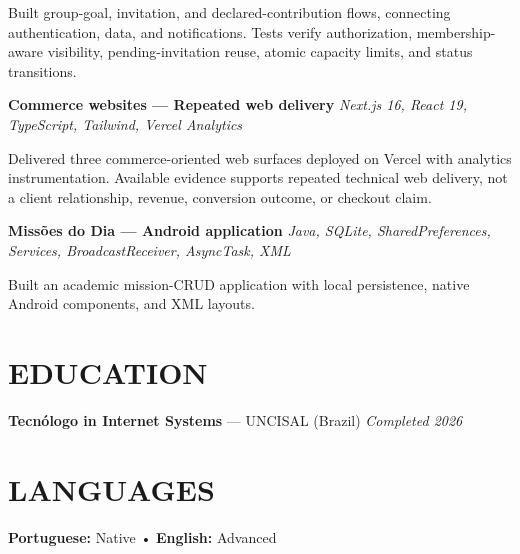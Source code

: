 \documentclass[10pt,a4paper]{article}
\begin{document}
\footnotesize

Built group-goal, invitation, and declared-contribution flows, connecting authentication, data, and notifications. Tests verify authorization, membership-aware visibility, pending-invitation reuse, atomic capacity limits, and status transitions.

\vspace{0.5pt}

\noindent
\textbf{Commerce websites — Repeated web delivery}
\hfill
\textit{Next.js 16, React 19, TypeScript, Tailwind, Vercel Analytics}

\footnotesize

Delivered three commerce-oriented web surfaces deployed on Vercel with analytics instrumentation. Available evidence supports repeated technical web delivery, not a client relationship, revenue, conversion outcome, or checkout claim.

\vspace{0.5pt}

\noindent
\textbf{Missões do Dia — Android application}
\hfill
\textit{Java, SQLite, SharedPreferences, Services, BroadcastReceiver, AsyncTask, XML}

\footnotesize

Built an academic mission-CRUD application with local persistence, native Android components, and XML layouts.

\section*{EDUCATION}

\noindent
\textbf{Tecnólogo in Internet Systems} — UNCISAL (Brazil)
\hfill
\textit{Completed 2026}


\section*{LANGUAGES}

\noindent
\textbf{Portuguese:} Native
\quad • \quad
\textbf{English:} Advanced
\end{document}
